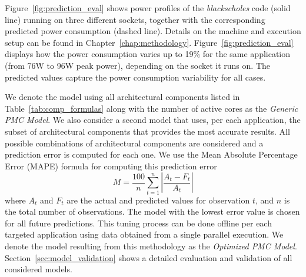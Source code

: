 Figure~\ref{fig:prediction_eval} shows power profiles of the \textit{blackscholes} code (solid line) running on three different sockets, together with the corresponding predicted power consumption (dashed line).
Details on the machine and execution setup can be found in Chapter~\ref{chap:methodology}.  
Figure~\ref{fig:prediction_eval} displays how the power consumption varies up to 19\% for the same application (from 76W to 96W peak power), depending on the socket it runs on.
The predicted values capture the power consumption variability for all cases. 

We denote the model using all architectural components listed in Table~\ref{tab:comp_formulas} along with the number of active cores as the \textit{Generic PMC Model}.
We also consider a second model that uses, per each application, the subset of architectural components that provides the most accurate results.  
All possible combinations of architectural components are considered and a prediction error is computed for each one.  
We use the Mean Absolute Percentage Error (MAPE) formula for computing this prediction error
\begin{equation}
\label{eq:mape}
M = \frac{100}{n}\sum^{n}_{t=1}|\frac{A_t - F_t}{A_t}|
\end{equation}
where $A_t$ and $F_t$ are the actual and predicted values for observation $t$, and $n$ is the total number of observations. 
The model with the lowest error value is chosen for all future predictions. 
This tuning process can be done offline per each targeted application using data obtained from a single parallel execution.
We denote the model resulting from this methodology as the \textit{Optimized PMC Model}.
Section~\ref{sec:model_validation} shows a detailed evaluation and validation of all considered models.
